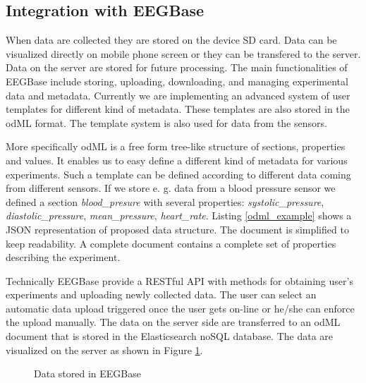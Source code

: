 \documentclass[a4paper,twoside]{article}
\begin{document}
\subsection{Integration with EEGBase}

When data are collected they are stored on the device SD card. Data can be visualized directly on mobile phone screen or they can be transfered to the server. Data on the server are stored for future processing. The main functionalities of EEGBase include storing, uploading, downloading, and managing experimental data and metadata. Currently we are implementing an advanced system of user templates for different kind of metadata. These templates are also stored in the odML format. The template system is also used for data from the sensors. 

More specifically odML is  a free form tree-like structure of sections, properties and values. It enables us to easy define a different kind of metadata for various experiments. Such a template can be defined according to different data coming from different sensors. If we store e. g. data from a blood pressure sensor we  defined a section \emph{blood\_presure} with several properties: \textit{systolic\_pressure}, \textit{diastolic\_pressure}, \textit{mean\_pressure}, \textit{heart\_rate}. Listing \ref{odml_example} shows a JSON representation of proposed data structure. The document is simplified to keep readability. A complete document contains a complete set of properties describing the experiment.

Technically EEGBase provide a RESTful API with methods for obtaining user's experiments and uploading newly collected data. The user can select an automatic data upload triggered once the user gets on-line or he/she can enforce the upload manually. The data on the server side are transferred to an odML document that is stored in the Elasticsearch noSQL database. The data are visualized on the server as shown in Figure \ref{fig:EEGBase}.


\begin{figure}

  \centering
   {}
  \caption{Data stored in EEGBase}
  \label{fig:EEGBase}
 \end{figure}
\end{document}
